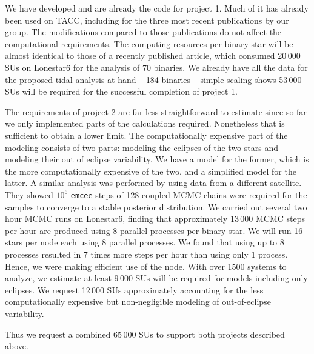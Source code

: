 \documentclass[12pt]{article}
\begin{document}
We have developed and are already the code for project 1. Much of it has already
been used on TACC, including for the three most recent publications by our
group. The modifications compared to those publications do not affect the
computational requirements. The computing resources per binary star will be
almost identical to those of a recently published article, which consumed
20\,000 SUs on Lonestar6 for the analysis of 70 binaries. We already have all
the data for the proposed tidal analysis at hand -- 184 binaries -- simple
scaling shows 53\,000 SUs will be required for the successful completion of
project 1.

The requirements of project 2 are far less straightforward to estimate since so
far we only implemented parts of the calculations required. Nonetheless that is
sufficient to obtain a lower limit. The computationally expensive part of the
modeling consists of two parts: modeling the eclipses of the two stars and
modeling their out of eclipse variability. We have a model for the former, which
is the more computationally expensive of the two, and a simplified model for the
latter. A similar analysis was performed by \citet{Windemuth_et_al_19} using
data from a different satellite.  They showed $10^6$ \texttt{emcee} steps of 128
coupled MCMC chains were required for the samples to converge to a stable
posterior distribution. We carried out several two hour MCMC runs on Lonestar6,
finding that approximately 13\,000 MCMC steps per hour are produced using 8
parallel processes per binary star.  We will run 16 stars per node each using 8
parallel processes. We found that using up to 8 processes resulted in 7 times
more steps per hour than using only 1 process.  Hence, we were making efficient
use of the node. With over 1500 systems to analyze, we estimate at least 9\,000
SUs will be required for models including only eclipses. We request 12\,000 SUs
approximately accounting for the less computationally expensive but
non-negligible modeling of out-of-eclipse variability.

Thus we request a combined 65\,000 SUs to support both projects described above.

\section*{}




\end{document}

